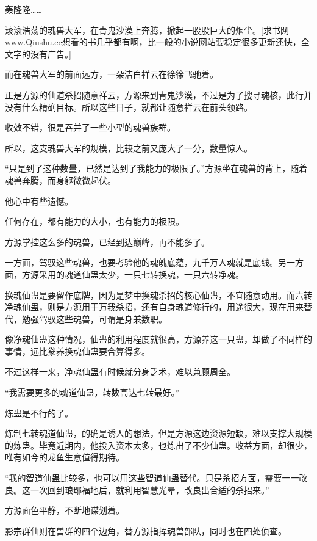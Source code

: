 
\begin{this_body}

轰隆隆……

滚滚浩荡的魂兽大军，在青鬼沙漠上奔腾，掀起一股股巨大的烟尘。[求书网www.Qiushu.cc想看的书几乎都有啊，比一般的小说网站要稳定很多更新还快，全文字的没有广告。]

而在魂兽大军的前面远方，一朵洁白祥云在徐徐飞驰着。

正是方源的仙道杀招随意祥云，方源来到青鬼沙漠，不过是为了搜寻魂核，此行并没有什么精确目标。所以这些日子，就都让随意祥云在前头领路。

收效不错，很是吞并了一些小型的魂兽族群。

所以，这支魂兽大军的规模，比较之前又庞大了一分，数量惊人。

“只是到了这种数量，已然是达到了我能力的极限了。”方源坐在魂兽的背上，随着魂兽奔腾，而身躯微微起伏。

他心中有些遗憾。

任何存在，都有能力的大小，也有能力的极限。

方源掌控这么多的魂兽，已经到达巅峰，再不能多了。

一方面，驾驭这些魂兽，也要考验他的魂魄底蕴，九千万人魂就是底线。另一方面，方源采用的魂道仙蛊太少，一只七转换魂，一只六转净魂。

换魂仙蛊是要留作底牌，因为是梦中换魂杀招的核心仙蛊，不宜随意动用。而六转净魂仙蛊，则是方源用于万我杀招，还有自身魂道修行的，用途很大，现在用来替代，勉强驾驭这些魂兽，可谓是身兼数职。

像净魂仙蛊这种情况，仙蛊的利用程度就很高，方源养这一只蛊，却做了不同样的事情，远比豢养换魂仙蛊要合算得多。

不过这样一来，净魂仙蛊有时候就分身乏术，难以兼顾周全。

“我需要更多的魂道仙蛊，转数高达七转最好。”

炼蛊是不行的了。

炼制七转魂道仙蛊，的确是诱人的想法，但是方源这边资源短缺，难以支撑大规模的炼蛊。毕竟近期内，他投入资本太多，也炼出了不少仙蛊。收益方面，却很少，唯有如今的龙鱼生意值得期待。

“我的智道仙蛊比较多，也可以用这些智道仙蛊替代。只是杀招方面，需要一一改良。这一次回到琅琊福地后，就利用智慧光晕，改良出合适的杀招来。”

方源面色平静，不断地谋划着。

影宗群仙则在兽群的四个边角，替方源指挥魂兽部队，同时也在四处侦查。


\end{this_body}
